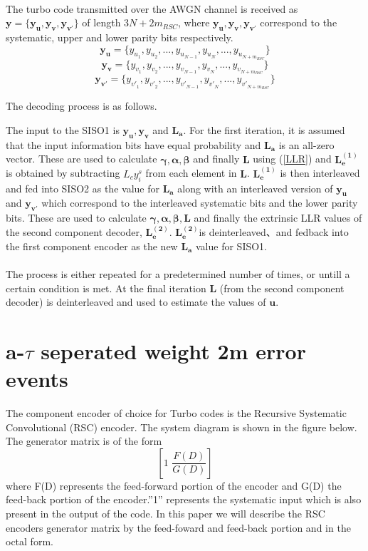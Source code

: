 \documentclass[20 pts]{article}
\begin{document}
 \paragraph{}
 The turbo code transmitted over the AWGN channel is received as
  $\mathbf{y}=\{\mathbf{y_u},\mathbf{y_v},\mathbf{y_{v'}} \}$ of length 
  $3N +2m_{RSC}$, where $\mathbf{y_u},\mathbf{y_v},\mathbf{y_{v'}}$
    correspond to the systematic, upper and lower parity bits respectively.
    $$\mathbf{y_u}=\{y_{u_1}, y_{u_2},...,y_{u_{N-1}}, y_{u_N}
     ,...,y_{u_{N+m_{RSC}}}\}$$ 
     $$\mathbf{y_v}=\{y_{v_1}, y_{v_2},...,y_{v_{N-1}}, y_{v_N} ,...,
     y_{v_{N+m_{RSC}}}\}$$
      $$\mathbf{y_{v'}}=\{y_{{v'}_1}, y_{{v'}_2},...,y_{{v'}_{N-1}}, y_{{v'}_N}
      ,...,y_{{v'}_{N+m_{RSC}}} \}$$ 
    
  The decoding process is as follows.
  

The input to the SISO1 is $\mathbf{y_u},\mathbf{y_v}$ and $\mathbf{L_a}$. 
For the first iteration, it is assumed 
that the input information bits have equal probability and $\mathbf{L_a}$ is an 
all-zero vector.
These are used to calculate $\boldsymbol{\gamma },\boldsymbol{\alpha} , 
\boldsymbol{\beta} $
 and finally
$\mathbf{L}$ using (\ref{LLR}) and $\mathbf{L_e^{(1)}}$ is obtained by subtracting
 $L_cy_i^s$  from each element in $\mathbf{L}$.
$\mathbf{L_e^{(1)}}$ is then
 interleaved and fed into SISO2 as the value for
 $\mathbf{L_a}$ along with an interleaved version of $\mathbf{y_u}$ and 
 $ \mathbf{y_{v'}}$ which correspond to
 the interleaved systematic bits and the lower parity bits. These are used to calculate 
 $\boldsymbol{\gamma },\boldsymbol{\alpha} , 
\boldsymbol{\beta},\mathbf{L}$
 and finally the extrinsic LLR values 
of the second component decoder, $\mathbf{L_e^{(2)}}$.
$\mathbf{L_e^{(2)}}$is deinterleaved、and fedback into the first component encoder
 as the new $\mathbf{L_a}$ value for SISO1.
\paragraph{}
The process is either repeated for a predetermined number of times, or untill a certain 
condition is met. At the final iteration $\mathbf{L}$ (from the second component
 decoder) is deinterleaved and used to estimate the values of $\mathbf{u}$.

\section{a-$\tau$ seperated weight 2m error events}
The component encoder of choice for Turbo codes is the Recursive Systematic 
Convolutional (RSC) encoder. The system diagram is shown in the figure below. The
generator matrix is of the form 
$$[1\,  \, \frac{F(D)}{G(D)}]$$ where F(D) represents the 
feed-forward portion of the encoder and G(D) the feed-back portion of the encoder.''1''
represents the systematic input which is also present in the output of the code. In this 
paper we will describe the RSC encoders generator matrix by the feed-foward and 
feed-back portion and in the  octal form.
\end{document}
